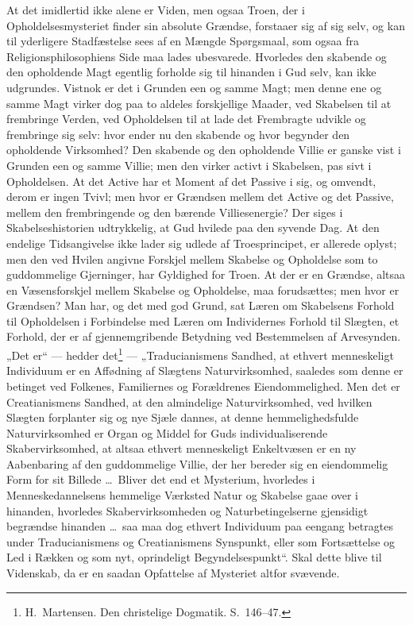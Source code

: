\documentclass[12pt]{book}
\begin{document}
At det imidlertid ikke alene er Viden, men ogsaa Troen, der i
Opholdelsesmysteriet finder sin absolute Grændse, forstaaer sig af
sig selv, og kan til yderligere Stadfæstelse sees af en Mængde
Spørgsmaal, som ogsaa fra Religionsphilosophiens Side maa lades
ubesvarede. Hvorledes den skabende og den opholdende Magt egentlig
forholde sig til hinanden i Gud selv, kan ikke udgrundes. Vistnok er
det i Grunden een og samme Magt; men denne ene og samme Magt virker
dog paa to aldeles forskjellige Maader, ved Skabelsen til at
frembringe Verden, ved Opholdelsen til at lade det Frembragte
udvikle og frembringe sig selv: hvor ender nu den skabende og hvor
begynder den opholdende Virksomhed? Den skabende og den opholdende
Villie er ganske vist i Grunden een og samme Villie; men den virker
activt i Skabelsen, pas\-
sivt i Opholdelsen. At det Active har et Moment af det Passive i
sig, og omvendt, derom er ingen Tvivl; men hvor er Grændsen mellem
det Active og det Passive, mellem den frembringende og den bærende
Villiesenergie? Der siges i Skabelseshistorien udtrykkelig, at Gud
hvilede paa den syvende Dag. At den endelige Tidsangivelse ikke
lader sig udlede af Troesprincipet, er allerede oplyst; men den ved
Hvilen angivne Forskjel mellem Skabelse og Opholdelse som to
guddommelige Gjerninger, har Gyldighed for Troen. At der er en
Grændse, altsaa en Væsensforskjel mellem Skabelse og Opholdelse, maa
forudsættes; men hvor er Grændsen? Man har, og det med god Grund,
sat Læren om Skabelsens Forhold til Opholdelsen i Forbindelse med
Læren om Individernes Forhold til Slægten, et Forhold, der er af
gjennemgribende Betydning ved Bestemmelsen af Arvesynden. „Det er“
--- hedder det\footnote{H.\ Martensen. Den christelige Dogmatik.
S.\ 146--47.} --- „Traducianismens Sandhed, at ethvert menneskeligt
Individuum er en Affødning af Slægtens Naturvirksomhed, saaledes som
denne er betinget ved Folkenes, Familiernes og Forældrenes
Eiendommelighed. Men det er Creatianismens Sandhed, at den
almindelige Naturvirksomhed, ved hvilken Slægten forplanter sig og
nye Sjæle dannes, at denne hemmelighedsfulde Naturvirksomhed er
Organ og Middel for Guds individualiserende Skabervirksomhed, at
altsaa ethvert menneskeligt Enkeltvæsen er en ny Aabenbaring af den
guddommelige Villie, der her bereder sig en eiendommelig Form for
sit Billede \dots\ Bliver det end et Mysterium, hvorledes i
Menneskedannelsens hemmelige Værksted Natur og Skabelse gaae over i
hinanden, hvorledes Skabervirksomheden og Naturbetingelserne
gjensidigt begrændse hinanden \dots\ saa maa dog ethvert Individuum
paa eengang betragtes under Traducianismens og Creatianismens
Synspunkt,
eller som Fortsættelse og Led i Rækken og som nyt, oprindeligt
Begyndelsespunkt“. Skal dette blive til Videnskab, da er en saadan
Opfattelse af Mysteriet altfor svævende.
\end{document}

